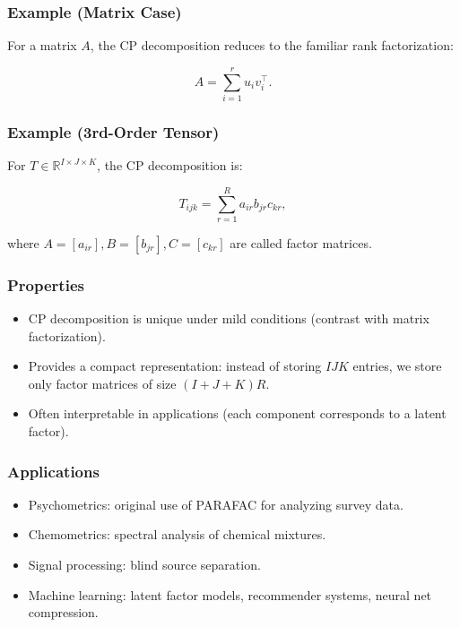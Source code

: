 \documentclass[
  letterpaper,
  DIV=11,
  numbers=noendperiod]{scrreprt}
\providecommand{\tightlist}{%
  \setlength{\itemsep}{0pt}\setlength{\parskip}{0pt}}
\begin{document}
\subsubsection{Example (Matrix Case)}\label{example-matrix-case}

For a matrix \(A\), the CP decomposition reduces to the familiar rank
factorization:

\[
A = \sum_{i=1}^r u_i v_i^\top.
\]

\subsubsection{Example (3rd-Order
Tensor)}\label{example-3rd-order-tensor-2}

For \(T \in \mathbb{R}^{I \times J \times K}\), the CP decomposition is:

\[
T_{ijk} = \sum_{r=1}^R a_{ir} b_{jr} c_{kr},
\]

where \(A = [a_{ir}], B = [b_{jr}], C = [c_{kr}]\) are called factor
matrices.

\subsubsection{Properties}\label{properties-3}

\begin{itemize}
\tightlist
\item
  CP decomposition is unique under mild conditions (contrast with matrix
  factorization).
\item
  Provides a compact representation: instead of storing \(IJK\) entries,
  we store only factor matrices of size \((I+J+K)R\).
\item
  Often interpretable in applications (each component corresponds to a
  latent factor).
\end{itemize}

\subsubsection{Applications}\label{applications-2}

\begin{itemize}
\tightlist
\item
  Psychometrics: original use of PARAFAC for analyzing survey data.
\item
  Chemometrics: spectral analysis of chemical mixtures.
\item
  Signal processing: blind source separation.
\item
  Machine learning: latent factor models, recommender systems, neural
  net compression.
\end{itemize}
\end{document}
